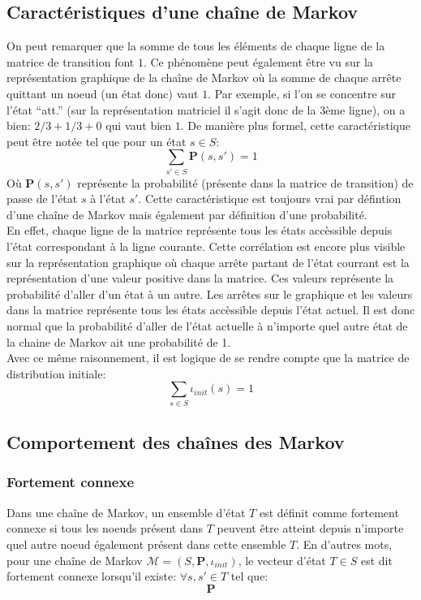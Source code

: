 \documentclass[letterpaper]{article}
\begin{document}
  \subsection{Caractéristiques d'une chaîne de Markov}
    On peut remarquer que la somme de tous les éléments de chaque ligne de la
    matrice de transition font $1$.  Ce phénomène peut également être vu
    sur la représentation graphique de la chaîne de Markov où la somme de chaque
    arrête quittant un noeud (un état donc) vaut $1$.  Par exemple, si l'on se
    concentre sur l'état ``att.'' (sur la représentation matriciel il s'agit donc 
    de la 3ème ligne), on a bien: $2/3 + 1/3 + 0$ qui vaut bien $1$.  De manière 
    plus formel, cette caractéristique peut être notée tel que pour un état $s \in S$:
    $$\sum\limits_{s' \in S} \mathbf{P}(s, s') = 1$$
    Où $\mathbf{P}(s, s')$ représente la probabilité (présente dans la matrice de
    transition) de passe de l'état $s$ à l'état $s'$.  Cette caractéristique est
    toujours vrai par défintion d'une chaîne de Markov mais également par définition
    d'une probabilité.\\
    En effet, chaque ligne de la matrice représente tous les états accèssible depuis
    l'état correspondant à la ligne courante.  Cette corrélation est encore plus
    visible sur la représentation graphique où chaque arrête partant de l'état courrant
    est la représentation d'une valeur positive dans la matrice.  Ces valeurs 
    représente la probabilité d'aller d'un état à un autre.  Les arrêtes sur le
    graphique et les valeurs dans la matrice représente tous les états accèssible
    depuis l'état actuel.  Il est donc normal que la probabilité d'aller de l'état
    actuelle à n'importe quel autre état de la chaine de Markov ait une probabilité de 1.\\
    Avec ce même raisonnement, il est logique de se rendre compte que la matrice
    de distribution initiale:
    $$\sum\limits_{s \in S} \iota_{init}(s) = 1$$
    
  \subsection{Comportement des chaînes des Markov}
    \subsubsection{Fortement connexe}
      Dans une chaîne de Markov, un ensemble d'état $T$ est définit comme fortement
      connexe si tous les noeuds présent dans $T$ peuvent être atteint depuis
      n'importe quel autre noeud également présent dans cette ensemble $T$. En
      d'autres mots, pour une chaîne de Markov $\mathcal{M} = (S, \mathbf{P}, 
      \iota_{init})$, le vecteur d'état $T \in S$ est dit fortement connexe 
      lorsqu'il existe: $\forall s, s' \in T$ tel que:
      $$\mathbf{P}$$
  
\end{document}
